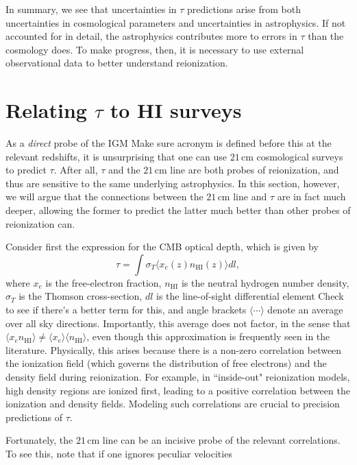 \documentclass[twocolumn,aps,prd,nofootinbib,showpacs]{revtex4-1}
\begin{document}
In summary, we see that uncertainties in $\tau$ predictions arise from both uncertainties in cosmological parameters and uncertainties in astrophysics. If not accounted for in detail, the astrophysics contributes more to errors in $\tau$ than the cosmology does. To make progress, then, it is necessary to use external observational data to better understand reionization.

\section{Relating $\tau$ to HI surveys}

As a \emph{direct} probe of the IGM \acl{Make sure acronym is defined before this} at the relevant redshifts, it is unsurprising that one can use $21\,\textrm{cm}$ cosmological surveys to predict $\tau$. After all, $\tau$ and the $21\,\textrm{cm}$ line are both probes of reionization, and thus are sensitive to the same underlying astrophysics. In this section, however, we will argue that the connections between the $21\,\textrm{cm}$ line and $\tau$ are in fact much deeper, allowing the former to predict the latter much better than other probes of reionization can.

Consider first the expression for the CMB optical depth, which is given by
\begin{equation}
\tau = \int  \sigma_T \langle x_e (z) n_\textrm{HI} (z) \rangle dl,
\end{equation}
where $x_e$ is the free-electron fraction, $n_\textrm{HI}$ is the neutral hydrogen number density, $\sigma_T$ is the Thomson cross-section, $dl$ is the line-of-sight differential element \acl{Check to see if there's a better term for this}, and angle brackets $\langle \cdots \rangle$ denote an average over all sky directions. Importantly, this average does not factor, in the sense that $\langle x_e n_\textrm{HI} \rangle \neq \langle x_e  \rangle \langle n_\textrm{HI}  \rangle$, even though this approximation is frequently seen in the literature. Physically, this arises because there is a non-zero correlation between the ionization field (which governs the distribution of free electrons) and the density field during reionization. For example, in ``inside-out" reionization models, high density regions are ionized first, leading to a positive correlation between the ionization and density fields. Modeling such correlations are crucial to precision predictions of $\tau$.

Fortunately, the $21\,\textrm{cm}$ line can be an incisive probe of the relevant correlations. To see this, note that if one ignores peculiar velocities 
\end{document}
